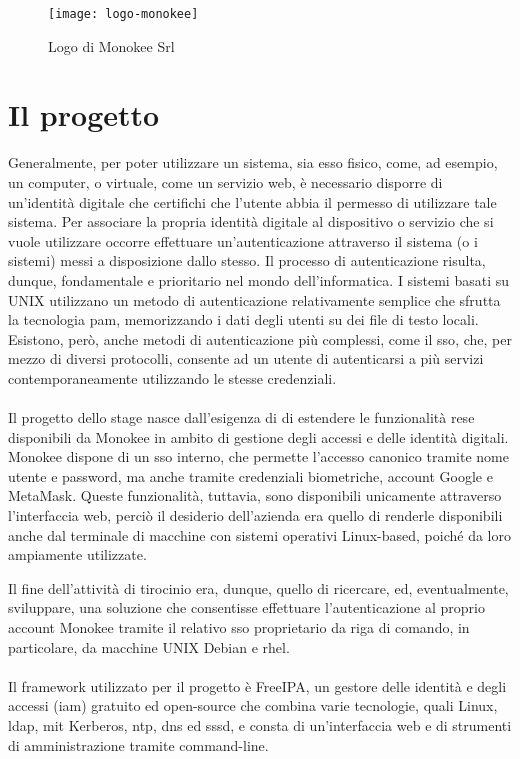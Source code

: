 \begin{figure}[H] 
    \centering 
    \texttt{[image: logo-monokee]} 
    \caption{Logo di Monokee Srl}
    \label{fig:monokee}
\end{figure}
    

\section{Il progetto}



Generalmente, per poter utilizzare un sistema, sia esso fisico, come, ad esempio, un computer, o virtuale, come un servizio web, è necessario disporre di un'identità digitale che certifichi che l'utente abbia il permesso di utilizzare tale sistema. Per associare la propria identità digitale al dispositivo o servizio che si vuole utilizzare occorre effettuare un'autenticazione attraverso il sistema (o i sistemi) messi a disposizione dallo stesso. Il processo di autenticazione risulta, dunque, fondamentale e prioritario nel mondo dell'informatica. I sistemi basati su UNIX utilizzano un metodo di autenticazione relativamente semplice che sfrutta la tecnologia \acrfull{pam}, memorizzando i dati degli utenti su dei file di testo locali. Esistono, però, anche metodi di autenticazione più complessi, come il \acrfull{sso}, che, per mezzo di diversi protocolli, consente ad un utente di autenticarsi a più servizi contemporaneamente utilizzando le stesse credenziali.
\\ \\
Il progetto dello stage nasce dall'esigenza di \myAzienda{} di estendere le funzionalità rese disponibili da Monokee in ambito di gestione degli accessi e delle identità digitali.
Monokee dispone di un \acrshort{sso} interno, che permette l'accesso canonico tramite nome utente e password, ma anche tramite credenziali biometriche, account Google e MetaMask. Queste funzionalità, tuttavia, sono disponibili unicamente attraverso l'interfaccia web, perciò il desiderio dell'azienda era quello di renderle disponibili anche dal terminale di macchine con sistemi operativi Linux-based, poiché da loro ampiamente utilizzate. 

Il fine dell'attività di tirocinio era, dunque, quello di ricercare, ed, eventualmente, sviluppare, una soluzione che consentisse effettuare l'autenticazione al proprio account Monokee tramite il relativo \acrshort{sso} proprietario da riga di comando, in particolare, da macchine UNIX Debian e \acrfull{rhel}.
\\ \\
Il framework utilizzato per il progetto è FreeIPA, un gestore delle identità e degli accessi (\acrshort{iam})
gratuito ed open-source che combina varie tecnologie, quali Linux, \acrfull{ldap}, \acrfull{mit} Kerberos, \acrfull{ntp}, \acrfull{dns} ed \acrfull{sssd}, e consta di un'interfaccia web e di strumenti di amministrazione tramite command-line\cite{site:freeipa-website}. 

